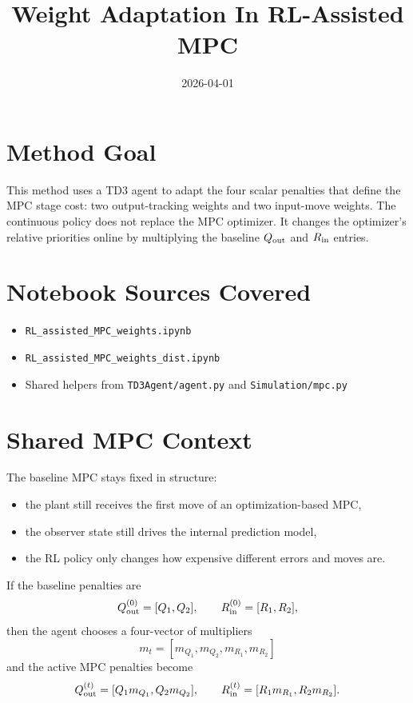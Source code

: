 \documentclass[11pt]{article}
\title{Weight Adaptation In RL-Assisted MPC}
\date{2026-04-01}
\begin{document}
\maketitle

\section*{Method Goal}

This method uses a TD3 agent to adapt the four scalar penalties that define the
MPC stage cost: two output-tracking weights and two input-move weights. The
continuous policy does not replace the MPC optimizer. It changes the optimizer's
relative priorities online by multiplying the baseline $Q_{\mathrm{out}}$ and $R_{\mathrm{in}}$
entries.

\section*{Notebook Sources Covered}

\begin{itemize}
\item \texttt{RL\_assisted\_MPC\_weights.ipynb}
\item \texttt{RL\_assisted\_MPC\_weights\_dist.ipynb}
\item Shared helpers from \texttt{TD3Agent/agent.py} and
      \texttt{Simulation/mpc.py}
\end{itemize}

\section*{Shared MPC Context}

The baseline MPC stays fixed in structure:

\begin{itemize}
\item the plant still receives the first move of an optimization-based MPC,
\item the observer state still drives the internal prediction model,
\item the RL policy only changes how expensive different errors and moves are.
\end{itemize}

If the baseline penalties are
\[
Q_{\mathrm{out}}^{(0)} = [Q_1, Q_2],
\qquad
R_{\mathrm{in}}^{(0)} = [R_1, R_2],
\]
then the agent chooses a four-vector of multipliers
\[
m_t = [m_{Q_1}, m_{Q_2}, m_{R_1}, m_{R_2}]
\]
and the active MPC penalties become
\[
Q_{\mathrm{out}}^{(t)} = [Q_1 m_{Q_1}, Q_2 m_{Q_2}],
\qquad
R_{\mathrm{in}}^{(t)} = [R_1 m_{R_1}, R_2 m_{R_2}].
\]
\end{document}
